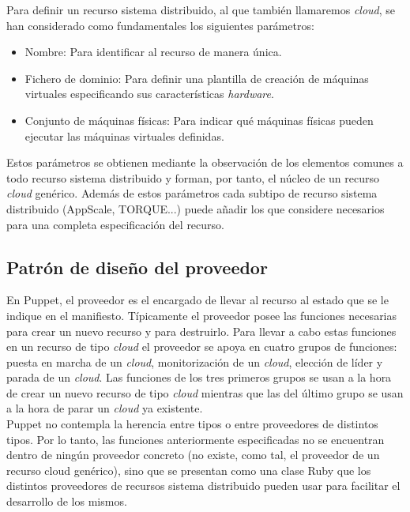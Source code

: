Para definir un recurso sistema distribuido, al que también llamaremos \emph{cloud}, se han considerado como fundamentales los siguientes parámetros:

\begin{itemize}
\item Nombre: Para identificar al recurso de manera única.
\item Fichero de dominio: Para definir una plantilla de creación de máquinas virtuales especificando sus características \emph{hardware}.
\item Conjunto de máquinas físicas: Para indicar qué máquinas físicas pueden ejecutar las máquinas virtuales definidas.
\end{itemize}

Estos parámetros se obtienen mediante la observación de los elementos comunes a todo recurso sistema distribuido y forman, por tanto, el núcleo de un recurso \emph{cloud} genérico. Además de estos parámetros cada subtipo de recurso sistema distribuido (AppScale, TORQUE...) puede añadir los que considere necesarios para una completa especificación del recurso.


\subsection{Patrón de diseño del proveedor}
\label{sec:modelado-proveedor}

En Puppet, el proveedor es el encargado de llevar al recurso al estado que se le indique en el manifiesto. Típicamente el proveedor posee las funciones necesarias para crear un nuevo recurso y para destruirlo. Para llevar a cabo estas funciones en un recurso de tipo \emph{cloud} el proveedor se apoya en cuatro grupos de funciones: puesta en marcha de un \emph{cloud}, monitorización de un \emph{cloud}, elección de líder y parada de un \emph{cloud}. Las funciones de los tres primeros grupos se usan a la hora de crear un nuevo recurso de tipo \emph{cloud} mientras que las del último grupo se usan a la hora de parar un \emph{cloud} ya existente. \\

Puppet no contempla la herencia entre tipos o entre proveedores de distintos tipos. Por lo tanto, las funciones anteriormente especificadas no se encuentran dentro de ningún proveedor concreto (no existe, como tal, el proveedor de un recurso cloud genérico), sino que se presentan como una clase Ruby que los distintos proveedores de recursos sistema distribuido pueden usar para facilitar el desarrollo de los mismos. \\

